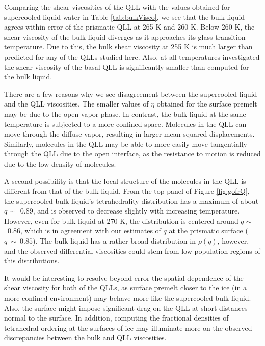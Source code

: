 Comparing the shear viscosities of the QLL with the values obtained
for supercooled liquid water in Table \ref{tab:bulkVisco}, we see that
the bulk liquid agrees within error of the prismatic QLL at 265 K and
260 K. Below 260 K, the shear viscosity of the bulk liquid diverges as
it approaches its glass transition temperature. Due to this, the bulk
shear viscosity at 255 K is much larger than predicted for any of the
QLLs studied here. Also, at all temperatures investigated the shear
viscosity of the basal QLL is significantly smaller than computed for
the bulk liquid. 

There are a few reasons why we see disagreement between the
supercooled liquid and the QLL viscosities. The smaller values of
$\eta$ obtained for the surface premelt may be due to the open vapor
phase. In contrast, the bulk liquid at the same temperature is
subjected to a more confined space. Molecules in the QLL can move
through the diffuse vapor, resulting in larger mean squared
displacements. Similarly, molecules in the QLL may be able to more
easily move tangentially through the QLL due to the open interface, as
the resistance to motion is reduced due to the low density of
molecules.

A second possibility is that the local structure of the molecules
in the QLL is different from that of the bulk liquid. From the top
panel of Figure \ref{fig:gofrQ}, the supercooled bulk liquid's
tetrahedrality distribution has a maximum of about $q \sim$~0.89, and
is observed to decrease slightly with increasing temperature. However,
even for bulk liquid at 270 K, the distribution is centered around
$q \sim$~0.86, which is in agreement with our estimates of $q$ at the
prismatic surface ($q~\sim~0.85$). The bulk liquid has a rather broad
distribution in $\rho (q)$, however, and the observed differential
viscosities could stem from low population regions of this
distributions. 

It would be interesting to resolve beyond error the spatial dependence
of the shear viscosity for both of the QLLs, as surface premelt closer
to the ice (in a more confined environment) may behave more like
the supercooled bulk liquid. Also, the surface might impose significant
drag on the QLL at short distances normal to the surface. In addition,
computing the fractional densities of tetrahedral ordering at the
surfaces of ice may illuminate more on the observed discrepancies
between the bulk and QLL viscosities. 





